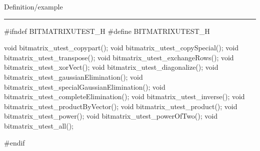 
Definition/example

\bigskip
\hrule
\code
#ifndef BITMATRIXUTEST_H
#define BITMATRIXUTEST_H
\endcode

\code
void bitmatrix_utest_copypart();
void bitmatrix_utest_copySpecial();
void bitmatrix_utest_transpose();
void bitmatrix_utest_exchangeRows();
void bitmatrix_utest_xorVect();
void bitmatrix_utest_diagonalize();
void bitmatrix_utest_gaussianElimination();
void bitmatrix_utest_specialGaussianElimination();
void bitmatrix_utest_completeElimination();
void bitmatrix_utest_inverse();
void bitmatrix_utest_productByVector();
void bitmatrix_utest_product();
void bitmatrix_utest_power();
void bitmatrix_utest_powerOfTwo();
void bitmatrix_utest_all();

#endif
\endcode
